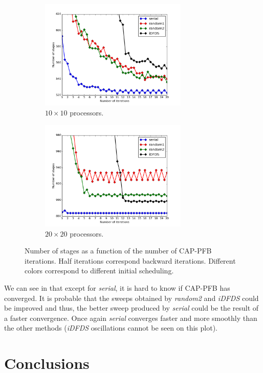 \documentclass{mc2015}
\renewcommand{\(}{\left(}
\renewcommand{\)}{\right)}
\renewcommand{\[}{\left[}
\renewcommand{\]}{\right]}
\begin{document}
\begin{figure}[H]
  \begin{subfigure}[b]{.5\textwidth}
    \centering
    \includegraphics[width=7cm]{convergence_band_20_20}
    \caption{$10\times 10$ processors.}
    \label{cb_10_10}
  \end{subfigure}
  \begin{subfigure}[b]{.5\textwidth}
    \centering
    \includegraphics[width=7cm]{convergence_band_40_40}
    \caption{$20\times 20$ processors.}
  \end{subfigure}
  \caption{Number of stages as a function of the number of CAP-PFB iterations.
  Half iterations correspond backward iterations. Different colors correspond to
  different initial scheduling.}
  \label{convergence_band}
\end{figure}
 
We can see in  that except for \emph{serial}, it is hard to know
if CAP-PFB has converged. It is probable that the sweeps obtained by
\emph{random2} and \emph{iDFDS} could be improved and thus, the better sweep
produced by \emph{serial} could be the result of a faster convergence. Once
again \emph{serial} converges faster and more smoothly than the other methods
(\emph{iDFDS} oscillations cannot be seen on this plot).

\section{Conclusions} \label{conclusions}
\end{document}
